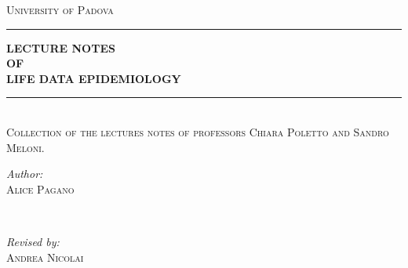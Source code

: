 \begin{titlepage} %
	\newcommand{\HRule}{\rule{\linewidth}{0.5mm}} %
	
	\center %
	
	
	\textsc{\LARGE University of Padova}\vspace{1.5cm} %
	

	
	\HRule \vspace{0.5cm}
	
	{\LARGE \bfseries LECTURE NOTES \\ OF\\ LIFE DATA EPIDEMIOLOGY \\}\vspace{0.5cm} %
	
	\HRule\\[0.5cm]

	\textsc{ \small Collection of the lectures notes of professors Chiara Poletto and Sandro Meloni.}\vspace{0.5cm} %
	
	\vspace{1.5cm}
	
	\begin{minipage}{0.4\textwidth}
		\begin{flushleft}
			\large
			\textit{Author:}\\
			\textsc{Alice Pagano} %
		\end{flushleft}
	\end{minipage}
	~
	\begin{minipage}{0.4\textwidth}
		\begin{flushright}
			\large
			\textit{Revised by:}\\
			\textsc{Andrea Nicolai} %
		\end{flushright}
	\end{minipage}
	

\end{titlepage}

